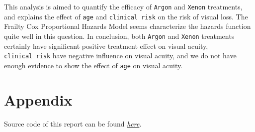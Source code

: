\documentclass[
]{article}
\begin{document}
This analysis is aimed to quantify the efficacy of \texttt{Argon} and
\texttt{Xenon} treatments, and explains the effect of \texttt{age} and
\texttt{clinical\ risk} on the risk of visual loss. The Frailty Cox
Proportional Hazards Model seems characterize the hazards function quite
well in this question. In conclusion, both \texttt{Argon} and
\texttt{Xenon} treatments certainly have significant positive treatment
effect on visual acuity, \texttt{clinical\ risk} have negative influence
on visual acuity, and we do not have enough evidence to show the effect
of \texttt{age} on visual acuity.

\pagebreak

\hypertarget{appendix}{%
\section{Appendix}\label{appendix}}

Source code of this report can be found
\href{https://github.com/ZhihaoXu/Stats504/blob/main/Assignment/assignment_2/stats504_hw2.Rmd}{\emph{here}}.
\end{document}
